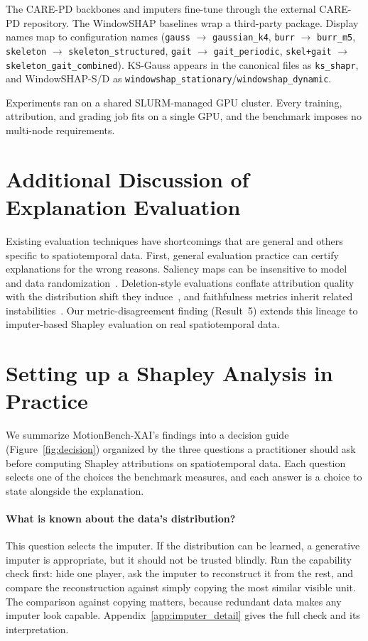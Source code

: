 The CARE-PD backbones and imputers fine-tune through the external CARE-PD
repository.  The WindowSHAP baselines wrap a third-party package.  Display
names map to configuration names (\texttt{gauss} $\to$
\texttt{gaussian\_k4}, \texttt{burr} $\to$ \texttt{burr\_m5},
\texttt{skeleton} $\to$ \texttt{skeleton\_structured},
\texttt{gait} $\to$ \texttt{gait\_periodic}, \texttt{skel+gait} $\to$
\texttt{skeleton\_gait\_combined}).  KS-Gauss appears in the canonical
files as \texttt{ks\_shapr}, and WindowSHAP-S/D as
\texttt{windowshap\_stationary}/\texttt{windowshap\_dynamic}.

Experiments ran on a shared SLURM-managed GPU cluster.  Every training,
attribution, and grading job fits on a single GPU, and the benchmark
imposes no multi-node requirements.

\section{Additional Discussion of Explanation Evaluation}
\label{app:eval_critique}

Existing evaluation techniques have shortcomings that are general and
others specific to spatiotemporal data. First, general evaluation practice
can certify explanations for the wrong reasons.
Saliency maps can be insensitive to model and data
randomization~\citep{adebayo2018sanity}. Deletion-style evaluations
conflate attribution quality with the distribution shift they
induce~\citep{hooker2019roar}, and faithfulness metrics inherit related
instabilities~\citep{bhatt2020evaluating,hedstrom2023quantus}. Our
metric-disagreement finding (Result~5) extends this lineage to imputer-based
Shapley evaluation on real spatiotemporal data.

\section{Setting up a Shapley Analysis in Practice}
\label{app:guide}

We summarize MotionBench-XAI's findings into a decision guide
(Figure~\ref{fig:decision}) organized by the three questions a practitioner
should ask before computing Shapley attributions on spatiotemporal data.
Each question selects one of the choices the benchmark measures, and each
answer is a choice to state alongside the explanation.

\paragraph{What is known about the data's distribution?}
This question selects the imputer. If the distribution can be learned, a
generative imputer is appropriate, but it should not be trusted blindly.
Run the capability check first: hide one player, ask the imputer to
reconstruct it from the rest, and compare the reconstruction against simply
copying the most similar visible unit. The comparison against copying
matters, because redundant data makes any imputer look capable.
Appendix~\ref{app:imputer_detail} gives the full check and its
interpretation.

